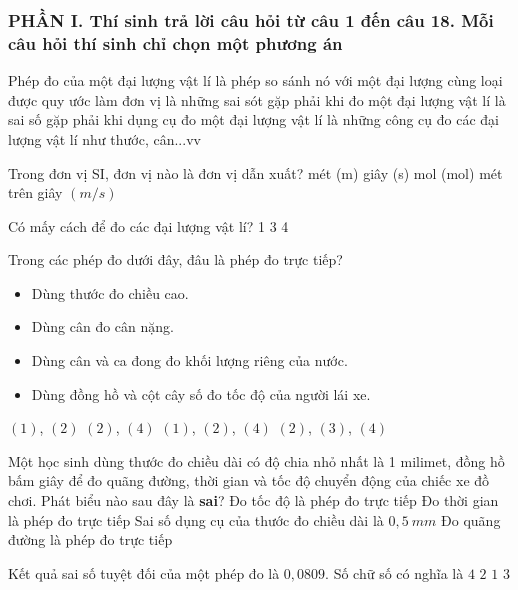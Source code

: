 \subsubsection*{PHẦN I. Thí sinh trả lời câu hỏi từ câu 1 đến câu 18. Mỗi câu hỏi thí sinh chỉ chọn một phương án}
\setcounter{ex}{0}
\begin{ex}%
Phép đo của một đại lượng vật lí
\choice
{\True là phép so sánh nó với một đại lượng cùng loại được quy ước làm đơn vị}
{là những sai sót gặp phải khi đo một đại lượng vật lí}
{là sai số gặp phải khi dụng cụ đo một đại lượng vật lí}
{là những công cụ đo các đại lượng vật lí như thước, cân...vv}
\loigiai{
}
\end{ex}
\begin{ex}%
Trong đơn vị SI, đơn vị nào là đơn vị dẫn xuất?
\choice
{mét (m)}
{giây (s)}
{mol (mol)}
{\True mét trên giây $(m/s)$}
\loigiai{

}

\end{ex}
\begin{ex}%
Có mấy cách để đo các đại lượng vật lí?
\choice
{1}
{}
{3}
{4}
\loigiai{

}
\end{ex}
\begin{ex}%
Trong các phép đo dưới đây, đâu là phép đo trực tiếp?
\begin{itemize}	
\item[(1)] Dùng thước đo chiều cao.
\item[(2)] Dùng cân đo cân nặng.
\item[(3)] Dùng cân và ca đong đo khối lượng riêng của nước.
\item[(4)] Dùng đồng hồ và cột cây số đo tốc độ của người lái xe.
\end{itemize}
\choice
{\True $(1)$, $(2)$}
{$(2)$, $(4)$}
{$(1)$, $(2)$, $(4)$}
{$(2)$, $(3)$, $(4)$}
\loigiai{
}
\end{ex}
\begin{ex}%
Một học sinh dùng thước đo chiều dài có độ chia nhỏ nhất là 1 milimet, đồng hồ bấm giây để đo quãng đường, thời gian và tốc độ chuyển động của chiếc xe đồ chơi. Phát biểu nào sau đây là \textbf{sai}?
\choice
{\True Đo tốc độ là phép đo trực tiếp}
{Đo thời gian là phép đo trực tiếp}
{Sai số dụng cụ của thước đo chiều dài là $0,5\ mm$}
{Đo quãng đường là phép đo trực tiếp}
\loigiai{}
\end{ex}
\begin{ex}%
Kết quả sai số tuyệt đối của một phép đo là $0,0809$. Số chữ số có nghĩa là
\choice
{$4$}
{$2$}
{$1$}
{\True $3$}
\end{ex}
